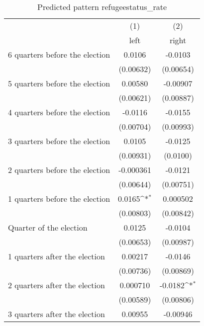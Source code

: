 \begin{table}[htbp]\centering
\def\sym#1{\ifmmode^{#1}\else\(^{#1}\)\fi}
\caption{Predicted pattern refugeestatus\_rate}
\begin{tabular}{l*{2}{c}}
\hline\hline
                    &\multicolumn{1}{c}{(1)}&\multicolumn{1}{c}{(2)}\\
                    &\multicolumn{1}{c}{left}&\multicolumn{1}{c}{right}\\
\hline
 6 quarters before the election&      0.0106         &     -0.0103         \\
                    &   (0.00632)         &   (0.00654)         \\
[1em]
 5 quarters before the election&     0.00580         &    -0.00907         \\
                    &   (0.00621)         &   (0.00887)         \\
[1em]
 4 quarters before the election&     -0.0116         &     -0.0155         \\
                    &   (0.00704)         &   (0.00993)         \\
[1em]
 3 quarters before the election&      0.0105         &     -0.0125         \\
                    &   (0.00931)         &    (0.0100)         \\
[1em]
 2 quarters before the election&   -0.000361         &     -0.0121         \\
                    &   (0.00644)         &   (0.00751)         \\
[1em]
 1 quarters before the election&      0.0165\sym{*}  &    0.000502         \\
                    &   (0.00803)         &   (0.00842)         \\
[1em]
Quarter of the election&      0.0125         &     -0.0104         \\
                    &   (0.00653)         &   (0.00987)         \\
[1em]
 1 quarters after the election&     0.00217         &     -0.0146         \\
                    &   (0.00736)         &   (0.00869)         \\
[1em]
 2 quarters after the election&    0.000710         &     -0.0182\sym{*}  \\
                    &   (0.00589)         &   (0.00806)         \\
[1em]
 3 quarters after the election&     0.00955         &    -0.00946         \\

\end{tabular}
\end{table}
